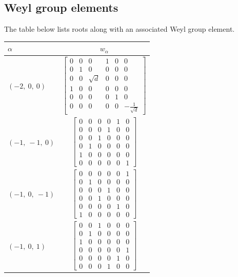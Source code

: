 \documentclass[11pt]{article}
\newcommand{\noi}{\noindent}
\theoremstyle{definition}
\begin{document}
\subsection{Weyl group elements}

\noi The table below lists roots along with an associated Weyl group element.

\bigskip

\noi \noindent \begin{longtable}{|l|c|}
    \hline
    $\alpha$ & $w_\alpha$ \\
    \hline
    \endhead
    $\left( -2, \  0, \  0\right)$ & ${\left[\begin{matrix}0 & 0 & 0 & 1 & 0 & 0\\0 & 1 & 0 & 0 & 0 & 0\\0 & 0 & \sqrt{d} & 0 & 0 & 0\\1 & 0 & 0 & 0 & 0 & 0\\0 & 0 & 0 & 0 & 1 & 0\\0 & 0 & 0 & 0 & 0 & - \frac{1}{\sqrt{d}}\end{matrix}\right]}$ \\
    \hline
    $\left( -1, \  -1, \  0\right)$ & ${\left[\begin{matrix}0 & 0 & 0 & 0 & 1 & 0\\0 & 0 & 0 & 1 & 0 & 0\\0 & 0 & 1 & 0 & 0 & 0\\0 & 1 & 0 & 0 & 0 & 0\\1 & 0 & 0 & 0 & 0 & 0\\0 & 0 & 0 & 0 & 0 & 1\end{matrix}\right]}$ \\
    \hline
    $\left( -1, \  0, \  -1\right)$ & ${\left[\begin{matrix}0 & 0 & 0 & 0 & 0 & 1\\0 & 1 & 0 & 0 & 0 & 0\\0 & 0 & 0 & 1 & 0 & 0\\0 & 0 & 1 & 0 & 0 & 0\\0 & 0 & 0 & 0 & 1 & 0\\1 & 0 & 0 & 0 & 0 & 0\end{matrix}\right]}$ \\
    \hline
    $\left( -1, \  0, \  1\right)$ & ${\left[\begin{matrix}0 & 0 & 1 & 0 & 0 & 0\\0 & 1 & 0 & 0 & 0 & 0\\1 & 0 & 0 & 0 & 0 & 0\\0 & 0 & 0 & 0 & 0 & 1\\0 & 0 & 0 & 0 & 1 & 0\\0 & 0 & 0 & 1 & 0 & 0\end{matrix}\right]}$ \\

\end{longtable}
\end{document}
